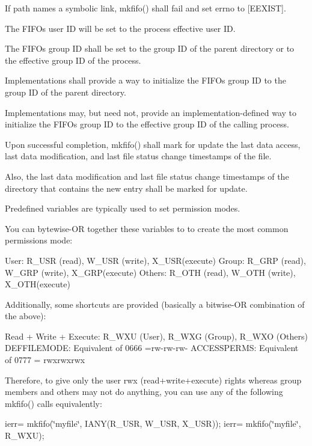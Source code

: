 If path names a symbolic link, mkfifo() shall fail and set errno to \mbox{[}E\+E\+X\+I\+ST\mbox{]}.

The F\+I\+FO\textquotesingle{}s user ID will be set to the process\textquotesingle{} effective user ID.

The F\+I\+FO\textquotesingle{}s group ID shall be set to the group ID of the parent directory or to the effective group ID of the process.

Implementations shall provide a way to initialize the F\+I\+FO\textquotesingle{}s group ID to the group ID of the parent directory.

Implementations may, but need not, provide an implementation-\/defined way to initialize the F\+I\+FO\textquotesingle{}s group ID to the effective group ID of the calling process.

Upon successful completion, mkfifo() shall mark for update the last data access, last data modification, and last file status change timestamps of the file.

Also, the last data modification and last file status change timestamps of the directory that contains the new entry shall be marked for update.

Predefined variables are typically used to set permission modes.

You can bytewise-\/\+OR together these variables to to create the most common permissions mode\+:

User\+: R\+\_\+\+U\+SR (read), W\+\_\+\+U\+SR (write), X\+\_\+\+U\+S\+R(execute) Group\+: R\+\_\+\+G\+RP (read), W\+\_\+\+G\+RP (write), X\+\_\+\+G\+R\+P(execute) Others\+: R\+\_\+\+O\+TH (read), W\+\_\+\+O\+TH (write), X\+\_\+\+O\+T\+H(execute)

Additionally, some shortcuts are provided (basically a bitwise-\/\+OR combination of the above)\+:

Read + Write + Execute\+: R\+\_\+\+W\+XU (User), R\+\_\+\+W\+XG (Group), R\+\_\+\+W\+XO (Others) D\+E\+F\+F\+I\+L\+E\+M\+O\+DE\+: Equivalent of 0666 =rw-\/rw-\/rw-\/ A\+C\+C\+E\+S\+S\+P\+E\+R\+MS\+: Equivalent of 0777 = rwxrwxrwx

Therefore, to give only the user rwx (read+write+execute) rights whereas group members and others may not do anything, you can use any of the following mkfifo() calls equivalently\+:

ierr= mkfifo(\char`\"{}myfile\char`\"{}, I\+A\+N\+Y(\+R\+\_\+\+U\+S\+R, W\+\_\+\+U\+S\+R, X\+\_\+\+U\+S\+R)); ierr= mkfifo(\char`\"{}myfile\char`\"{}, R\+\_\+\+W\+XU);

